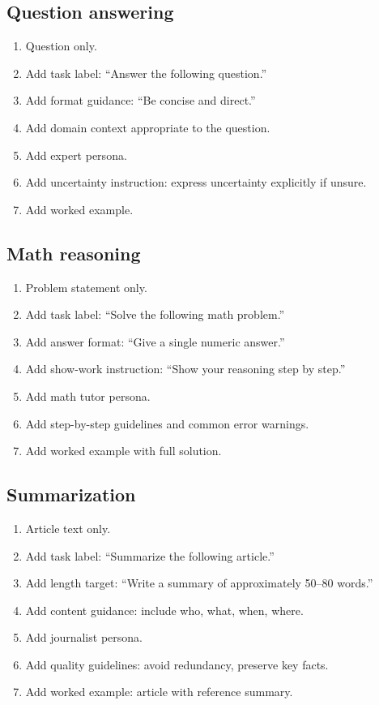 \subsection{Question answering}
\begin{enumerate}
  \item Question only.
  \item Add task label: ``Answer the following question.''
  \item Add format guidance: ``Be concise and direct.''
  \item Add domain context appropriate to the question.
  \item Add expert persona.
  \item Add uncertainty instruction: express uncertainty explicitly if unsure.
  \item Add worked example.
\end{enumerate}

\subsection{Math reasoning}
\begin{enumerate}
  \item Problem statement only.
  \item Add task label: ``Solve the following math problem.''
  \item Add answer format: ``Give a single numeric answer.''
  \item Add show-work instruction: ``Show your reasoning step by step.''
  \item Add math tutor persona.
  \item Add step-by-step guidelines and common error warnings.
  \item Add worked example with full solution.
\end{enumerate}

\subsection{Summarization}
\begin{enumerate}
  \item Article text only.
  \item Add task label: ``Summarize the following article.''
  \item Add length target: ``Write a summary of approximately 50--80 words.''
  \item Add content guidance: include who, what, when, where.
  \item Add journalist persona.
  \item Add quality guidelines: avoid redundancy, preserve key facts.
  \item Add worked example: article with reference summary.
\end{enumerate}

